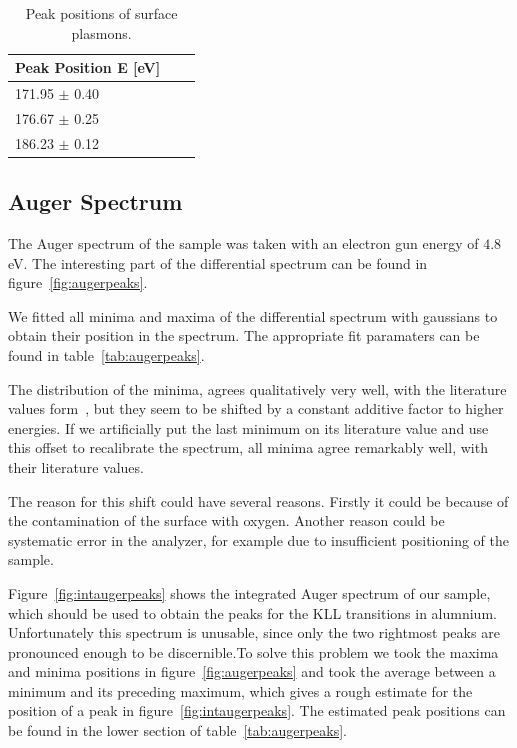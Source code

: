 \documentclass[a4paper,10pt]{scrartcl}
\begin{document}
\begin{table}
\begin{center}
\begin{tabular}{lcc}
\toprule
Peak Position E [eV]\\
\midrule
171.95 $\pm$ 0.40 \\
176.67 $\pm$ 0.25 \\
186.23 $\pm$ 0.12 \\
\bottomrule
\end{tabular}
\end{center}
\par
\caption{Peak positions of surface plasmons. \label{tab:surfacepeaks}}
\end{table}

\subsection{Auger Spectrum}

The Auger spectrum of the sample was taken with an electron gun energy of $4.8\,$eV. The interesting part of the differential spectrum can be found in figure~\ref{fig:augerpeaks}. 

We fitted all minima and maxima of the differential spectrum with gaussians to obtain their position in the spectrum. The appropriate fit paramaters can be found in table~\ref{tab:augerpeaks}.

The distribution of the minima, agrees qualitatively very well, with the literature values form~\cite{handbook}, but they seem to be shifted by a constant additive factor to higher energies. If we artificially put the last minimum on its literature value and use this offset to recalibrate the spectrum, all minima agree remarkably well, with their literature values.

The reason for this shift could have several reasons. Firstly it could be because of the contamination of the surface with oxygen. Another reason could be systematic error in the analyzer, for example due to insufficient positioning of the sample.

Figure~\ref{fig:intaugerpeaks} shows the integrated Auger spectrum of our sample, which should be used to obtain the peaks for the KLL transitions in alumnium. Unfortunately this spectrum is unusable, since only the two rightmost peaks are pronounced enough to be discernible.To solve this problem we took the maxima and minima positions in figure~\ref{fig:augerpeaks} and took the average between a minimum and its preceding maximum, which gives a rough estimate for the position of a peak in figure~\ref{fig:intaugerpeaks}. The estimated peak positions can be found in the lower section of table~\ref{tab:augerpeaks}. 
\end{document}
